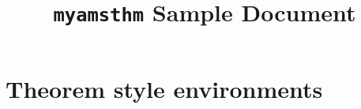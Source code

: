 \documentclass{article}
\begin{document}
\title{\texttt{myamsthm} Sample Document}
\author{}
\date{}

\maketitle

\begin{verbatim*}
\usepackage{myamsthm}
\end{verbatim*}

\section{Theorem style environments}

\begin{corollary}\leavevmode
\begin{verbatim*}
\begin{corollary}
\end{corollary}
\end{verbatim*}
\end{corollary}

\begin{corollary*}\leavevmode
\begin{verbatim*}
\begin{corollary*}
\end{corollary*}
\end{verbatim*}
\end{corollary*}

\begin{lemma}\leavevmode
\begin{verbatim*}
\begin{lemma}
\end{lemma}
\end{verbatim*}
\end{lemma}

\begin{lemma*}\leavevmode
\begin{verbatim*}
\begin{lemma*}
\end{lemma*}
\end{verbatim*}
\end{lemma*}

\begin{proposition}\leavevmode
\begin{verbatim*}
\begin{proposition}
\end{proposition}
\end{verbatim*}
\end{proposition}
\end{document}
